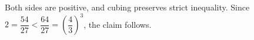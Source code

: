 Both sides are positive, and cubing preserves strict inequality. Since $2=\dfrac{54}{27}<\dfrac{64}{27}=(\dfrac{4}{3})^3$, the claim follows.
